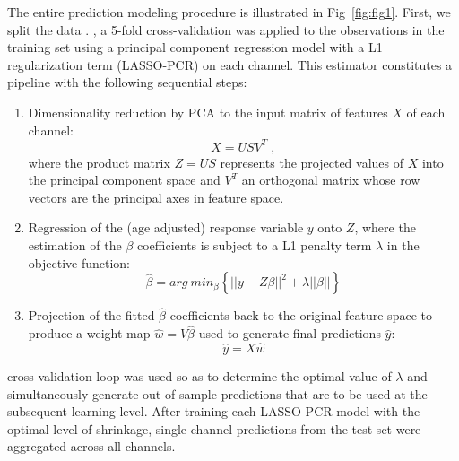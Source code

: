 \documentclass[10pt,letterpaper]{article}
\begin{document}
The entire prediction modeling procedure is illustrated in Fig~\ref{fig:fig1}. First, we split the data .  , a 5-fold cross-validation was applied to the observations in the training set using a principal component regression model with a L1 regularization term (LASSO-PCR) on each channel. This estimator constitutes a pipeline with the following sequential steps:
\begin{enumerate}
    \item Dimensionality reduction by PCA to the input matrix of features $X$ of each channel:
    \begin{equation}
        X = USV^T\;,
    \end{equation}
    where the product matrix $Z = US$ represents the projected values of $X$ into the principal component space and $V^T$ an orthogonal matrix whose row vectors are the principal axes in feature space.
    \item Regression of the (age adjusted) response variable $y$ onto $Z$, where the estimation of the $\beta$ coefficients is subject to a L1 penalty term $\lambda$ in the objective function: 
    \begin{equation}
    \hat{\beta}  = arg \ min_\beta \left\{||y- Z\beta||^2 + \lambda ||\beta||\right\}         
    \end{equation}
    \item Projection of the fitted $\hat{\beta}$ coefficients back to the original feature space to produce a weight map  $\hat{w} = V\hat{\beta}$ used to generate final predictions $\hat{y}$:
    \begin{equation}
        \hat{y} = X \hat{w}
    \end{equation}
    \end{enumerate}
 cross-validation loop  was used so as to determine the optimal value of $\lambda$  and simultaneously generate out-of-sample predictions that are to be used  at the subsequent learning level. After training each LASSO-PCR model with the optimal level of shrinkage, single-channel predictions from the test set were aggregated across all channels. 
\end{document}
